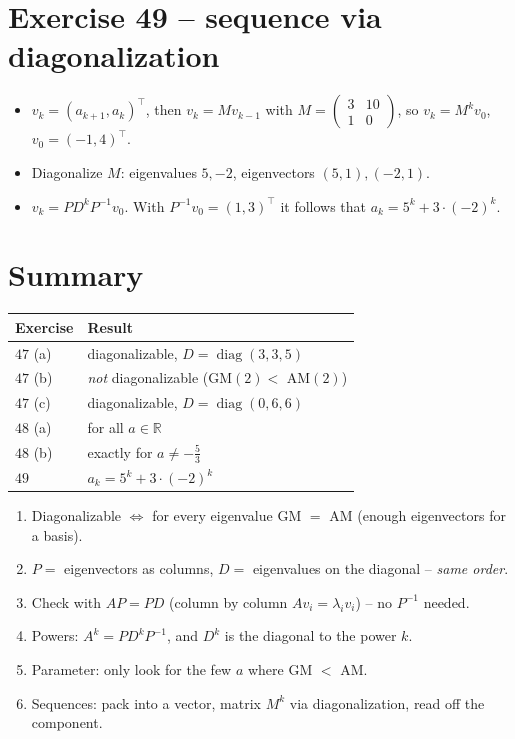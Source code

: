 \documentclass[a4paper,12pt]{article}
\begin{document}
\section*{Exercise 49 -- sequence via diagonalization}

\begin{itemize}[leftmargin=*, nosep]
    \item $v_k = (a_{k+1}, a_k)^\top$, then $v_k = M v_{k-1}$ with $M = \left(\begin{smallmatrix} 3&10\\1&0 \end{smallmatrix}\right)$, so $v_k = M^k v_0$, $v_0 = (-1,4)^\top$.
    \item Diagonalize $M$: eigenvalues $5, -2$, eigenvectors $(5,1), (-2,1)$.
    \item $v_k = P D^k P^{-1} v_0$. With $P^{-1} v_0 = (1,3)^\top$ it follows that $a_k = 5^k + 3\cdot(-2)^k$.
\end{itemize}

\section*{Summary}

\begin{center}
\begin{tabular}{@{}ll@{}}
\toprule
Exercise & Result \\
\midrule
$47$ (a) & diagonalizable, $D = \operatorname{diag}(3,3,5)$ \\
$47$ (b) & \emph{not} diagonalizable (GM$(2) < $ AM$(2)$) \\
$47$ (c) & diagonalizable, $D = \operatorname{diag}(0,6,6)$ \\
$48$ (a) & for all $a \in \mathbb{R}$ \\
$48$ (b) & exactly for $a \neq -\tfrac{5}{3}$ \\
$49$ & $a_k = 5^k + 3\cdot(-2)^k$ \\
\bottomrule
\end{tabular}
\end{center}

\begin{merkbox}[title={Golden rules}]
\begin{enumerate}[leftmargin=*, nosep]
    \item Diagonalizable $\Leftrightarrow$ for every eigenvalue GM $=$ AM (enough eigenvectors for a basis).
    \item $P =$ eigenvectors as columns, $D =$ eigenvalues on the diagonal -- \emph{same order}.
    \item Check with $AP = PD$ (column by column $A v_i = \lambda_i v_i$) -- no $P^{-1}$ needed.
    \item Powers: $A^k = P D^k P^{-1}$, and $D^k$ is the diagonal to the power $k$.
    \item Parameter: only look for the few $a$ where GM $<$ AM.
    \item Sequences: pack into a vector, matrix $M^k$ via diagonalization, read off the component.
\end{enumerate}
\end{merkbox}
\end{document}
